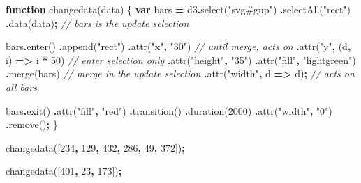 \documentclass[
  openany]{book}
\newenvironment{Shaded}{\begin{snugshade}}{\end{snugshade}}
\newcommand{\CommentTok}[1]{\textcolor[rgb]{0.56,0.35,0.01}{\textit{#1}}}
\newcommand{\DecValTok}[1]{\textcolor[rgb]{0.00,0.00,0.81}{#1}}
\newcommand{\FunctionTok}[1]{\textcolor[rgb]{0.00,0.00,0.00}{#1}}
\newcommand{\KeywordTok}[1]{\textcolor[rgb]{0.13,0.29,0.53}{\textbf{#1}}}
\newcommand{\NormalTok}[1]{#1}
\newcommand{\OperatorTok}[1]{\textcolor[rgb]{0.81,0.36,0.00}{\textbf{#1}}}
\newcommand{\StringTok}[1]{\textcolor[rgb]{0.31,0.60,0.02}{#1}}
\begin{document}
\begin{Shaded}
\begin{Highlighting}[]
\KeywordTok{function} \FunctionTok{changedata}\NormalTok{(data) \{}
  \KeywordTok{var}\NormalTok{ bars }\OperatorTok{=}\NormalTok{ d3}\OperatorTok{.}\FunctionTok{select}\NormalTok{(}\StringTok{"svg\#gup"}\NormalTok{) }
    \OperatorTok{.}\FunctionTok{selectAll}\NormalTok{(}\StringTok{"rect"}\NormalTok{)}
    \OperatorTok{.}\FunctionTok{data}\NormalTok{(data)}\OperatorTok{;}    \CommentTok{// bars is the update selection}
    
\NormalTok{  bars}\OperatorTok{.}\FunctionTok{enter}\NormalTok{()}
    \OperatorTok{.}\FunctionTok{append}\NormalTok{(}\StringTok{"rect"}\NormalTok{)}
      \OperatorTok{.}\FunctionTok{attr}\NormalTok{(}\StringTok{"x"}\OperatorTok{,} \StringTok{"30"}\NormalTok{)  }\CommentTok{// until merge, acts on}
      \OperatorTok{.}\FunctionTok{attr}\NormalTok{(}\StringTok{"y"}\OperatorTok{,}\NormalTok{ (d}\OperatorTok{,}\NormalTok{ i) }\KeywordTok{=\textgreater{}}\NormalTok{ i }\OperatorTok{*} \DecValTok{50}\NormalTok{) }\CommentTok{// enter selection only}
      \OperatorTok{.}\FunctionTok{attr}\NormalTok{(}\StringTok{"height"}\OperatorTok{,} \StringTok{"35"}\NormalTok{)  }
      \OperatorTok{.}\FunctionTok{attr}\NormalTok{(}\StringTok{"fill"}\OperatorTok{,} \StringTok{"lightgreen"}\NormalTok{)}
    \OperatorTok{.}\FunctionTok{merge}\NormalTok{(bars) }\CommentTok{// merge in the update selection}
      \OperatorTok{.}\FunctionTok{attr}\NormalTok{(}\StringTok{"width"}\OperatorTok{,}\NormalTok{ d }\KeywordTok{=\textgreater{}}\NormalTok{ d)}\OperatorTok{;} \CommentTok{// acts on all bars}
      
\NormalTok{  bars}\OperatorTok{.}\FunctionTok{exit}\NormalTok{()}
    \OperatorTok{.}\FunctionTok{attr}\NormalTok{(}\StringTok{"fill"}\OperatorTok{,} \StringTok{"red"}\NormalTok{)}
    \OperatorTok{.}\FunctionTok{transition}\NormalTok{()}
    \OperatorTok{.}\FunctionTok{duration}\NormalTok{(}\DecValTok{2000}\NormalTok{)}
    \OperatorTok{.}\FunctionTok{attr}\NormalTok{(}\StringTok{"width"}\OperatorTok{,} \StringTok{"0"}\NormalTok{)}
    \OperatorTok{.}\FunctionTok{remove}\NormalTok{()}\OperatorTok{;}
\NormalTok{  \}}
\end{Highlighting}
\end{Shaded}

\begin{Shaded}
\begin{Highlighting}[]
\NormalTok{changedata([}\DecValTok{234}\OperatorTok{,} \DecValTok{129}\OperatorTok{,} \DecValTok{432}\OperatorTok{,} \DecValTok{286}\OperatorTok{,} \DecValTok{49}\OperatorTok{,} \DecValTok{372}\NormalTok{])}\OperatorTok{;}

\NormalTok{changedata([}\DecValTok{401}\OperatorTok{,} \DecValTok{23}\OperatorTok{,} \DecValTok{173}\NormalTok{])}\OperatorTok{;}
\end{Highlighting}
\end{Shaded}
\end{document}
